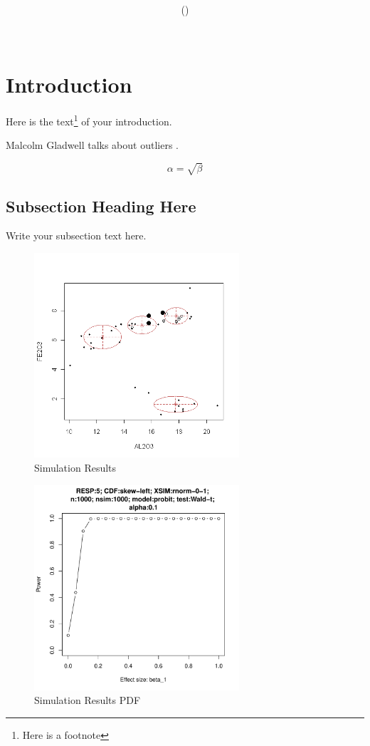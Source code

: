 \documentclass{article}
\title{\hmwkCourse \\ \hmwkTitle}
\author{\hmwkAuthor \\ (\hmwkEmail) \\ \hmwkWSU \\[0.5in] \hmwkInstructor }
\date{\hmwkDate}
\begin{document}
\maketitle


\section{Introduction}
Here is the text\footnote{Here is a footnote} of your introduction.

Malcolm Gladwell talks about outliers \citep{Gladwell:2008}.

\begin{equation}
    \label{simple_equation}
    \alpha = \sqrt{ \beta }
\end{equation}

\subsection{Subsection Heading Here}
Write your subsection text here.

\begin{figure}
    \centering
    \includegraphics[width=3.0in]{graphics/myfigure}
    \caption{Simulation Results}
    \label{simulationfigure}
\end{figure}


\begin{figure}
    \centering
    \includegraphics[width=3.0in]{graphics/pdffigure}
    \caption{Simulation Results PDF}
    \label{simulationfigurepdf}
\end{figure}
\end{document}
